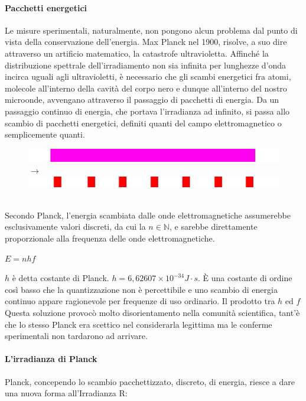 \documentclass{article}
\begin{document}
\paragraph{Pacchetti energetici}
Le misure sperimentali, naturalmente, non pongono alcun problema dal punto di vista della conservazione dell'energia.
Max Planck nel 1900, risolve, a suo dire attraverso un artificio matematico, la catastrofe ultravioletta.  Affinché la distribuzione spettrale dell'irradiamento non sia infinita per lunghezze d'onda incirca uguali agli ultravioletti, è necessario che gli scambi energetici fra atomi, molecole all'interno della cavità del corpo nero e dunque all'interno del nostro microonde, avvengano attraverso il passaggio di pacchetti di energia. Da un passaggio continuo di energia, che portava l'irradianza ad infinito, si passa allo scambio di pacchetti energetici, definiti quanti del campo elettromagnetico o semplicemente quanti.
 \begin{figure}[h]
\centering
\includegraphics[scale=0.340]{21.png} $\to$
\includegraphics[scale=0.340]{20.png}
\label{fig: cubed graph}
\end{figure}\\
Secondo Planck, l'energia scambiata dalle onde elettromagnetiche assumerebbe esclusivamente valori discreti, da cui la $n \in \mathbb{N}$, e
sarebbe direttamente proporzionale alla frequenza delle onde elettromagnetiche.
\begin{center}
    $E = nhf$
\end{center}
$h$ è detta costante di Planck. $h = 6,62607 \times 10^{-34} J \cdot s$. È una costante di ordine così basso che la quantizzazione non è percettibile e uno scambio di energia continuo appare ragionevole per frequenze di uso ordinario. Il prodotto tra $h$ ed $f$
Questa soluzione provocò molto disorientamento nella comunità scientifica, tant'è che lo stesso Planck era scettico nel considerarla legittima ma le conferme sperimentali non tardarono ad arrivare.
\paragraph{L'irradianza di Planck}
Planck, concependo lo scambio pacchettizzato, discreto, di energia, riesce a dare una nuova forma all'Irradianza R: 
\end{document}
